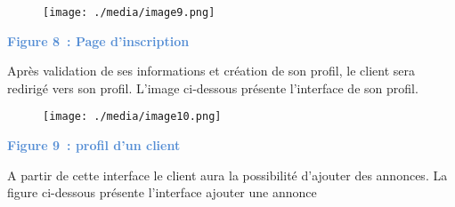 \documentclass[12pt]{report}
\begin{document}
\begin{enumerate}[label*={\fontsize{18pt}{18pt}\selectfont \textbf{\arabic*.}}]

\begin{figure}[H]
	\begin{Center}
		\texttt{[image: ./media/image9.png]}
	\end{Center}
\end{figure}



\par

\begin{Center}
\textbf{\textcolor[HTML]{548DD4}{Figure 8 : Page d’inscription}}
\end{Center}\par

\begin{justify}
Après validation de ses informations et création de son profil, le client sera redirigé vers son profil. L’image ci-dessous présente l'interface de son profil.
\end{justify}\par





\begin{figure}[H]
	\begin{Center}
		\texttt{[image: ./media/image10.png]}
	\end{Center}
\end{figure}



\begin{Center}
\textbf{\textcolor[HTML]{548DD4}{Figure 9 : profil d’un client}}
\end{Center}\par


\vspace{\baselineskip}







\begin{justify}
A partir de cette interface le client aura la possibilité d’ajouter des annonces. La figure ci-dessous présente l'interface ajouter une annonce
\end{justify}\par


\end{enumerate}
\end{document}
